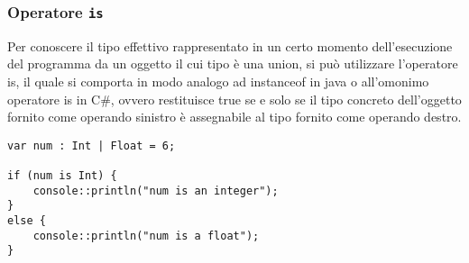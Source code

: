 \subsubsection{Operatore \texttt{is}} 
Per conoscere il tipo effettivo rappresentato in un certo momento dell’esecuzione del programma da un oggetto il cui tipo è una union, si può utilizzare 
l’operatore is, il quale si comporta in modo analogo ad instanceof in java o all’omonimo operatore is in C\#, ovvero restituisce true se e solo se il tipo 
concreto dell’oggetto fornito come operando sinistro è assegnabile al tipo fornito come operando destro. \\

\vspace{0.5cm}
\begin{lstlisting}[frame=single]
var num : Int | Float = 6;

if (num is Int) {
    console::println("num is an integer");
}
else { 
    console::println("num is a float");
}
\end{lstlisting}
\vspace{0.5cm}